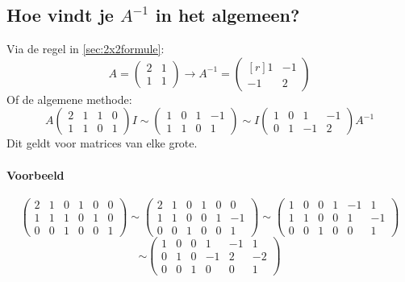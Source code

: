 \subsection{Hoe vindt je $A^{-1}$ in het algemeen?}
Via de regel in \autoref{sec:2x2formule}: \[ A = \begin{pmatrix} 2 & 1 \\
1 & 1 \end{pmatrix} \to A^{-1} = \begin{pmatrix*}[r] 1 & -1 \\
-1 & 2 \end{pmatrix*} \]
Of de algemene methode:
\[ A \left(\!\begin{array}{rr|rr} 2 & 1 & 1 & 0 \\
1 & 1 & 0 & 1\end{array}\!\right) I \sim \left(\!\begin{array}{rr|rr} 1 & 0 & 1 & -1 \\
1 & 1 & 0 & 1\end{array}\!\right) \sim I \left(\!\begin{array}{rr|rr} 1 & 0 & 1 & -1 \\
0 & 1 & -1 & 2 \end{array}\!\right) A^{-1} \]
Dit geldt voor matrices van elke grote.

\paragraph{Voorbeeld}
\[ \left(\!\begin{array}{rrr|rrr} 2 & 1 & 0 & 1 & 0 & 0 \\
1 & 1 & 1 & 0 & 1 & 0 \\
0 & 0 & 1 & 0 & 0 & 1 \end{array}\!\right) \sim \left(\!\begin{array}{rrr|rrr} 2 & 1 & 0 & 1 & 0 & 0 \\
1 & 1 & 0 & 0 & 1 & -1 \\
0 & 0 & 1 & 0 & 0 & 1 \end{array}\!\right) \sim \left(\!\begin{array}{rrr|rrr} 1 & 0 & 0 & 1 & -1 & 1 \\
1 & 1 & 0 & 0 & 1 & -1 \\
0 & 0 & 1 & 0 & 0 & 1 \end{array}\!\right) \] 
\[ \sim \left(\!\begin{array}{rrr|rrr} 1 & 0 & 0 & 1 & -1 & 1 \\
0 & 1 & 0 & -1 & 2 & -2 \\
0 & 0 & 1 & 0 & 0 & 1 \end{array}\!\right) \]


